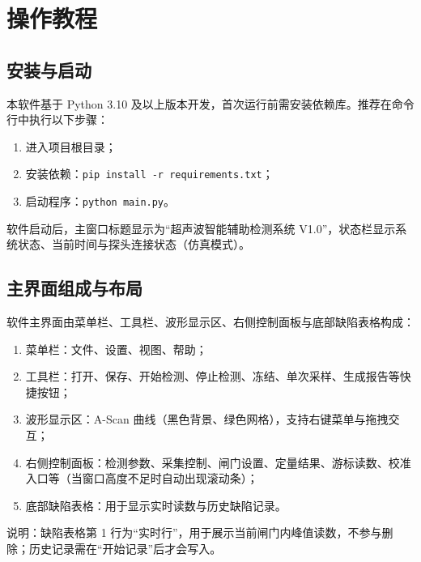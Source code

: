 %
%
\section{操作教程}

\subsection{安装与启动}
\par
本软件基于 Python 3.10 及以上版本开发，首次运行前需安装依赖库。推荐在命令行中执行以下步骤：
\begin{enumerate}
	\item 进入项目根目录；
	\item 安装依赖：\texttt{pip install -r requirements.txt}；
	\item 启动程序：\texttt{python main.py}。
\end{enumerate}
\par
软件启动后，主窗口标题显示为“超声波智能辅助检测系统 V1.0”，状态栏显示系统状态、当前时间与探头连接状态（仿真模式）。


\subsection{主界面组成与布局}
\par
软件主界面由菜单栏、工具栏、波形显示区、右侧控制面板与底部缺陷表格构成：
\begin{enumerate}
	\item 菜单栏：文件、设置、视图、帮助；
	\item 工具栏：打开、保存、开始检测、停止检测、冻结、单次采样、生成报告等快捷按钮；
	\item 波形显示区：A-Scan 曲线（黑色背景、绿色网格），支持右键菜单与拖拽交互；
	\item 右侧控制面板：检测参数、采集控制、闸门设置、定量结果、游标读数、校准入口等（当窗口高度不足时自动出现滚动条）；
	\item 底部缺陷表格：用于显示实时读数与历史缺陷记录。
\end{enumerate}
\par
说明：缺陷表格第 1 行为“实时行”，用于展示当前闸门内峰值读数，不参与删除；历史记录需在“开始记录”后才会写入。

